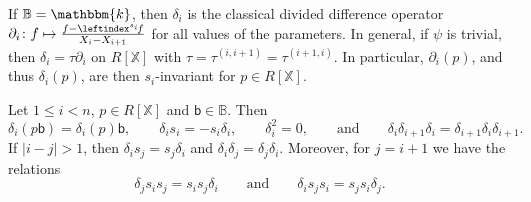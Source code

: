 \documentclass[a4paper,11pt]{amsart}
\numberwithin{equation}{subsection}
\theoremstyle{definition}
\theoremstyle{theorem}
\theoremstyle{remark}
\newcommand\bb{\mathsf{b}}
\newcommand\X{\mathbb{X}}
\newcommand\kk{\mathbbm{k}}
\newcommand{\Bo}{\mathbb{B}}
\begin{document}
\begin{Remark}\label{R:classical}
If $\Bo=\kk$, then $\delta_i$ is the classical divided difference operator
$\partial_i\colon f\mapsto\tfrac{f-\leftindex^{s_i}\!f}{X_i-X_{i+1}}$ for all values of the
parameters. In general, if $\psi$ is trivial, then $\delta_i=\tau\partial_i$ on $R[\X]$ with $\tau=\tau^{(i,i+1)}=\tau^{(i+1,i)}$.
 In particular, $\partial_i(p)$, and thus $\delta_i(p)$,  are then $s_i$-invariant for $p\in R[\X]$.
  \end{Remark}
\begin{Lemma}\label{L:deltarel}
  Let $1\le i<n$, $p\in R[\X]$ and $\bb\in\Bo$. Then
  \begin{equation}\label{deltarel}
    \delta_i(p\bb)=\delta_i(p)\bb,\qquad
    \delta_is_i=-s_i\delta_i,\qquad
    \delta_i^2=0,\qquad\text{and}\qquad
    \delta_i\delta_{i+1}\delta_i=\delta_{i+1}\delta_i\delta_{i+1}.
  \end{equation}
  If $|i-j|>1$, then $\delta_is_j=s_j\delta_i$ and
  $\delta_i\delta_j=\delta_j\delta_i$. Moreover, for
  $j=i+1$ we have the relations
  \begin{equation}\label{deltaequiv}
    \delta_js_is_j=s_is_j\delta_i
    \qquad\text{and}\qquad
    \delta_is_js_i=s_js_i\delta_j .
  \end{equation}
\end{Lemma}
\end{document}
